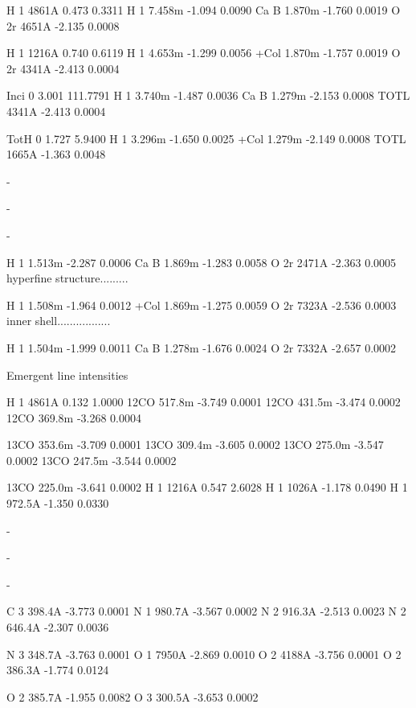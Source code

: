 { H  1  4861A   0.473   0.3311      H  1 7.458m  -1.094   0.0090      Ca
B 1.870m  -1.760   0.0019      O 2r  4651A  -2.135   0.0008            

 H  1  1216A   0.740   0.6119      H  1 4.653m  -1.299   0.0056      +Col
1.870m  -1.757   0.0019      O 2r  4341A  -2.413   0.0004            

 Inci     0    3.001 111.7791      H  1 3.740m  -1.487   0.0036      Ca
B 1.279m  -2.153   0.0008      TOTL  4341A  -2.413   0.0004            

 TotH     0    1.727   5.9400      H  1 3.296m  -1.650   0.0025      +Col
1.279m  -2.149   0.0008      TOTL  1665A  -1.363   0.0048            

-

 -

 -

 H  1 1.513m  -2.287   0.0006      Ca B 1.869m  -1.283   0.0058      O 2r
2471A  -2.363   0.0005      hyperfine structure.........            

 H  1 1.508m  -1.964   0.0012      +Col 1.869m  -1.275   0.0059      O 2r
7323A  -2.536   0.0003      inner shell.................            

 H  1 1.504m  -1.999   0.0011      Ca B 1.278m  -1.676   0.0024      O 2r
7332A  -2.657   0.0002            

                                                   Emergent line intensities

 H  1  4861A   0.132   1.0000      12CO 517.8m  -3.749   0.0001      12CO
431.5m  -3.474   0.0002      12CO 369.8m  -3.268   0.0004      

 13CO 353.6m  -3.709   0.0001      13CO 309.4m  -3.605   0.0002      13CO
275.0m  -3.547   0.0002      13CO 247.5m  -3.544   0.0002      

 13CO 225.0m  -3.641   0.0002      H  1  1216A   0.547   2.6028        
H  1  1026A  -1.178   0.0490      H  1 972.5A  -1.350   0.0330      

-

-

-

 C  3 398.4A  -3.773   0.0001      N  1 980.7A  -3.567   0.0002      N 
2 916.3A  -2.513   0.0023      N  2 646.4A  -2.307   0.0036      

 N  3 348.7A  -3.763   0.0001      O  1  7950A  -2.869   0.0010      O 
2  4188A  -3.756   0.0001      O  2 386.3A  -1.774   0.0124      

 O  2 385.7A  -1.955   0.0082      O  3 300.5A  -3.653   0.0002      

}
